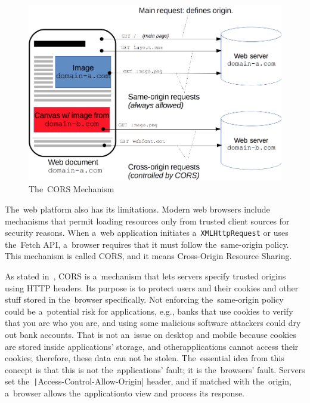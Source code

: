\begin{figure}
    \centering
    \includegraphics[width=1\linewidth]{assets/design/cors.png}
    \caption{The~CORS Mechanism~\cite{a2022_crossorigin}}
    \label{fig:design:cors-mechanism}
\end{figure}

The~web platform also has its limitations.
Modern web browsers include mechanisms that permit loading resources only from trusted client sources for security reasons.
When a~web application initiates a~\texttt{XMLHttpRequest} or uses the~Fetch API, a~browser requires that it must follow the~same-origin policy.
This mechanism is called CORS, and it means Cross-Origin Resource Sharing.

As stated in~\cite{a2022_crossorigin}, CORS is a~mechanism that lets servers specify trusted origins using HTTP headers.
Its purpose is to protect users and their cookies and other stuff stored in the~browser specifically.
Not enforcing the~same-origin policy could be a~potential risk for applications, e.g., banks that use cookies to verify that you are who you are, and using some malicious software attackers could dry out bank accounts.
That is not an~issue on desktop and mobile because cookies are stored inside applications' storage, and other\linebreak{}applications cannot access their cookies; therefore, these data can not be stolen.
The~essential idea from this concept is that this is not the~applications' fault; it is the~browsers' fault.
Servers set the~\texttt|Access-Control-Allow-Origin| header, and if matched with the~origin, a~browser allows the~application\linebreak{}to view and process its response.

